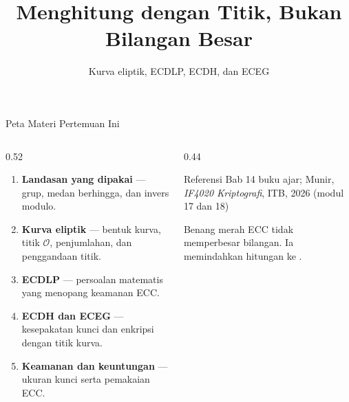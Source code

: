 \documentclass[aspectratio=169,11pt]{beamer}
\title{Menghitung dengan Titik, Bukan Bilangan Besar}
\subtitle{Kurva eliptik, ECDLP, ECDH, dan ECEG}
\begin{document}
\begin{frame}[plain]
    \titlepage
\end{frame}

\begin{frame}{Peta Materi Pertemuan Ini}
    \begin{columns}[T,onlytextwidth]
        \begin{column}{0.52\textwidth}
            \footnotesize
            \begin{enumerate}
                \item \textbf{Landasan yang dipakai} --- grup, medan
                      berhingga, dan invers modulo.
                \item \textbf{Kurva eliptik} --- bentuk kurva, titik
                      $\mathcal{O}$, penjumlahan, dan penggandaan titik.
                \item \textbf{ECDLP} --- persoalan matematis yang menopang
                      keamanan ECC.
                \item \textbf{ECDH dan ECEG} --- kesepakatan kunci dan
                      enkripsi dengan titik kurva.
                \item \textbf{Keamanan dan keuntungan} --- ukuran kunci serta
                      pemakaian ECC.
            \end{enumerate}
        \end{column}
        \begin{column}{0.44\textwidth}
            \begin{block}{Referensi}
                \footnotesize
                Bab 14 buku ajar; Munir, \textit{IF4020 Kriptografi}, ITB,
                2026 (modul 17 dan 18)
            \end{block}
            \begin{exampleblock}{Benang merah}
                \footnotesize
                ECC tidak memperbesar bilangan. Ia memindahkan hitungan ke
                .
            \end{exampleblock}
        \end{column}
    \end{columns}
\end{frame}
\end{document}
